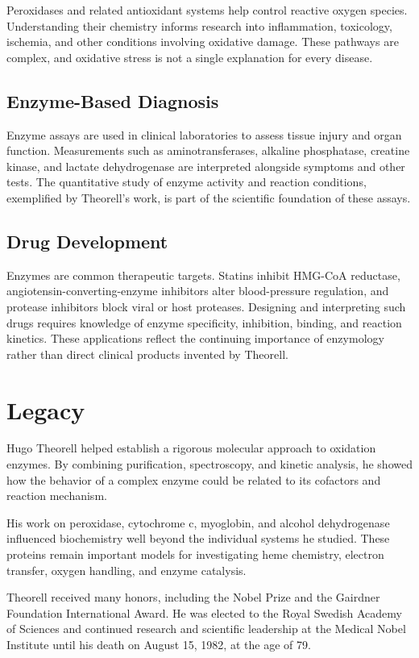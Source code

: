Peroxidases and related antioxidant systems help control reactive oxygen species. Understanding their chemistry informs research into inflammation, toxicology, ischemia, and other conditions involving oxidative damage. These pathways are complex, and oxidative stress is not a single explanation for every disease.

\subsection{Enzyme-Based Diagnosis}

Enzyme assays are used in clinical laboratories to assess tissue injury and organ function. Measurements such as aminotransferases, alkaline phosphatase, creatine kinase, and lactate dehydrogenase are interpreted alongside symptoms and other tests. The quantitative study of enzyme activity and reaction conditions, exemplified by Theorell's work, is part of the scientific foundation of these assays.

\subsection{Drug Development}

Enzymes are common therapeutic targets. Statins inhibit HMG-CoA reductase, angiotensin-converting-enzyme inhibitors alter blood-pressure regulation, and protease inhibitors block viral or host proteases. Designing and interpreting such drugs requires knowledge of enzyme specificity, inhibition, binding, and reaction kinetics. These applications reflect the continuing importance of enzymology rather than direct clinical products invented by Theorell.

\section{Legacy}

Hugo Theorell helped establish a rigorous molecular approach to oxidation enzymes. By combining purification, spectroscopy, and kinetic analysis, he showed how the behavior of a complex enzyme could be related to its cofactors and reaction mechanism.

His work on peroxidase, cytochrome c, myoglobin, and alcohol dehydrogenase influenced biochemistry well beyond the individual systems he studied. These proteins remain important models for investigating heme chemistry, electron transfer, oxygen handling, and enzyme catalysis.

Theorell received many honors, including the Nobel Prize and the Gairdner Foundation International Award. He was elected to the Royal Swedish Academy of Sciences and continued research and scientific leadership at the Medical Nobel Institute until his death on August 15, 1982, at the age of 79.

